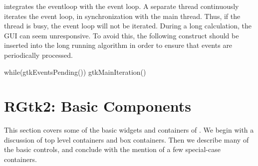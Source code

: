  integrates the \GTK\/ eventloop with the \R\/ event
loop. A separate thread continuously iterates the \GTK\/ event loop,
in synchronization with the main \R\/ thread.  Thus, if the \R\/
thread is busy, the \GTK\/ event loop will not be iterated. During a
long calculation, the GUI can seem unresponsive. To avoid this, the
following construct should be inserted into the long running algorithm
in order to ensure that \GTK\/ events are periodically processed.

\begin{Schunk}
\begin{Sinput}
 while(gtkEventsPending()) 
   gtkMainIteration()
\end{Sinput}
\end{Schunk}







\chapter{RGtk2: Basic Components}
\label{sec:top-level-windows}




This section covers some of the basic widgets and containers of
\GTK. We begin with a discussion of top level containers and box
containers. Then we describe many of the basic controls, and
conclude with the mention of a few special-case containers.

